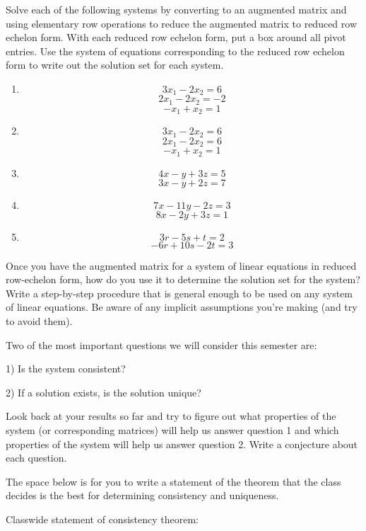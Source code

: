 \begin{question}\label{q3} Solve each of the following systems by converting to an augmented matrix and using elementary row operations to reduce the augmented matrix to reduced row echelon form. With each reduced row echelon form, put a box around all pivot entries. Use the system of equations corresponding to the reduced row echelon form to write out the solution set for each system.
\begin{enumerate}
\item  $$ 3x_1-2x_2=6$$
$$ 2x_1-2x_2=-2 $$
$$-x_1+x_2=1 $$
\item  $$ 3x_1-2x_2=6$$
$$ 2x_1-2x_2=6 $$
$$-x_1+x_2=1 $$
\item  $$4x-y+3z=5$$
$$3x-y+2z=7$$
\item  $$7x-11y-2z=3$$
$$8x-2y+3z=1$$
\item  $$3r-5s+t=2$$
$$-6r+10s-2t=3$$
\end{enumerate}
\end{question}
\begin{question}
Once you have the augmented matrix for a system of linear equations in reduced row-echelon form, how do you use it to determine the solution set for the system? Write a step-by-step procedure that is general enough to be used on any system of linear equations. Be aware of any implicit assumptions you're making (and try to avoid them). 
\end{question}



Two of the most important questions we will consider this semester are:

1) Is the system consistent?

2) If a solution exists, is the solution unique?

\begin{question} Look back at your results so far and try to figure out what properties of the system (or corresponding matrices) will help us answer question 1 and which properties of the system will help us answer question 2. Write a conjecture about each question. \end{question}

The space below is for you to write a statement of the theorem that the class decides is the best for determining consistency and uniqueness.
\begin{theorem}
Classwide statement of consistency theorem:
\vspace{2.5in}

\end{theorem}

